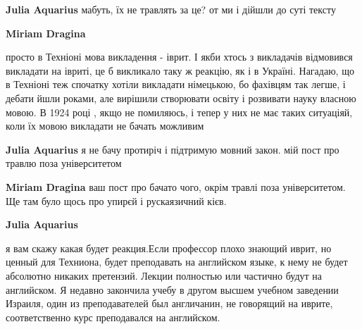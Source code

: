 \begin{itemize}
\begin{itemize}
 
\textbf{Julia Aquarius} мабуть, їх не травлять за це? от ми і дійшли до суті тексту

 
\textbf{Miriam Dragina} 

просто в Техніоні мова викладення - іврит. І якби хтось з викладачів відмовився
викладати на івриті, це б викликало таку ж реакцію, як і в Україні. Нагадаю, що
в Техніоні теж спочатку хотіли викладати німецькою, бо фахівцям так легше, і
дебати йшли роками, але вирішили створювати освіту і розвивати науку власною
мовою. В 1924 році , якщо не помиляюсь, і тепер у них не має таких ситуаціяй,
коли їх мовою викладати не бачать можливим


 
\textbf{Julia Aquarius} я не бачу протиріч і підтримую мовний закон. мій пост про травлю поза університетом

 
\textbf{Miriam Dragina} ваш пост про бачато чого, окрім травлі поза університетом. Ще там було щось про упирєй і рускаязичний кієв.

 
\textbf{Julia Aquarius} 

я вам скажу какая будет реакция.Если профессор плохо знающий иврит, но ценный
для Техниона, будет преподавать на английском языке, к нему не будет абсолютно
никаких претензий. Лекции полностью или частично будут на английском. Я недавно
закончила учебу в другом высшем учебном заведении Израиля, один из
преподавателей был англичанин, не говорящий на иврите, соответственно курс
преподавался на английском.



\end{itemize}
\end{itemize}
